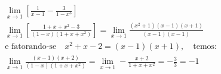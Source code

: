 \begin{ex}
\begin{align}
&\lim_{x\rightarrow 1} \left[\frac{1}{x-1}-\frac{3}{1-x^3}\right]\nonumber\\
&\lim_{x\rightarrow 1} \left[\frac{1+x+x^2-3}{(1-x)(1+x+x^2)}\right] = \lim_{x\rightarrow 1} \frac{(x^2+1)(x-1)(x+1)}{(x-1)(x-1)}\nonumber\\
&\text{e fatorando-se}\quad x^2+x-2=(x-1)(x+1),\quad \text{temos:}\nonumber\\
&\lim_{x\rightarrow 1} \frac{(x-1)(x+2)}{(1-x)(1+x+x^2)}=\lim_{x\rightarrow 1} -\frac{x+2}{1+x+x^2}=-\frac{3}{3}=-1\nonumber
\end{align}
\end{ex}
